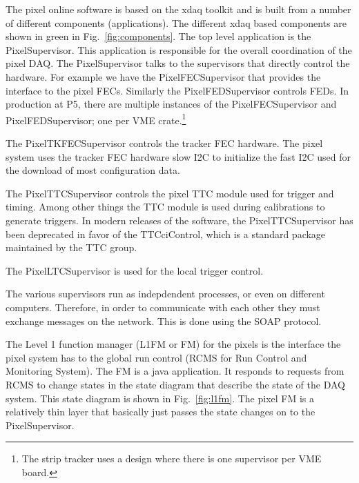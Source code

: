 
The pixel online software is based on the xdaq toolkit and is
built from a number of different components (applications). The
different xdaq based components are shown in green in 
Fig.~\ref{fig:components}. The top level application is the 
PixelSupervisor. This application is responsible for the overall
coordination of the pixel DAQ. The PixelSupervisor talks to the
supervisors that directly control the hardware. For example 
we have the PixelFECSupervisor that provides the interface to the
pixel FECs. Similarly the PixelFEDSupervisor controls FEDs. 
In production at P5, there are multiple instances of the PixelFECSupervisor and
PixelFEDSupervisor; one per VME crate.\footnote{The strip tracker
uses a design where there is one supervisor per VME board.}

The PixelTKFECSupervisor controls the tracker FEC hardware. The
pixel system uses the tracker FEC hardware slow I2C to
initialize the fast I2C used for the download of most 
configuration data.

The PixelTTCSupervisor controls the pixel TTC module used for trigger
and timing. Among other things the TTC module is used during
calibrations to generate triggers. In modern releases of the software,
the PixelTTCSupervisor has been deprecated in favor of the
TTCciControl, which is a standard package maintained by the TTC group.

The PixelLTCSupervisor is used for the local trigger control.

The various supervisors run as indepdendent processes, or even on
different computers. Therefore, in order to communicate with each
other they must exchange messages on the network. This is done using
the SOAP protocol.

The Level 1 function manager (L1FM or FM) for the pixels is the
interface the pixel system has to the global run control (RCMS for
Run Control and Monitoring System). The FM is a java application.
It responds to requests from RCMS to change states in the 
state diagram that describe the state of the DAQ system. This
state diagram is shown in Fig.~\ref{fig:l1fm}.  The pixel
FM is a relatively thin layer that basically just passes the state
changes on to the PixelSupervisor. 

